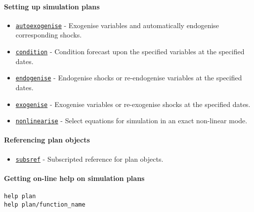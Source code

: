 \paragraph{Setting up simulation
plans}

\begin{itemize}
\itemsep1pt\parskip0pt
\item
  \href{plan/autoexogenise}{\texttt{autoexogenise}} - Exogenise
  variables and automatically endogenise corresponding shocks.
\item
  \href{plan/condition}{\texttt{condition}} - Condition forecast upon
  the specified variables at the specified dates.
\item
  \href{plan/endogenise}{\texttt{endogenise}} - Endogenise shocks or
  re-endogenise variables at the specified dates.
\item
  \href{plan/exogenise}{\texttt{exogenise}} - Exogenise variables or
  re-exogenise shocks at the specified dates.
\item
  \href{plan/nonlinearise}{\texttt{nonlinearise}} - Select equations for
  simulation in an exact non-linear mode.
\end{itemize}

\paragraph{Referencing plan objects}

\begin{itemize}
\itemsep1pt\parskip0pt
\item
  \href{plan/subsref}{\texttt{subsref}} - Subscripted reference for plan
  objects.
\end{itemize}

\paragraph{Getting on-line help on simulation
plans}

\begin{verbatim}
help plan
help plan/function_name
\end{verbatim}



